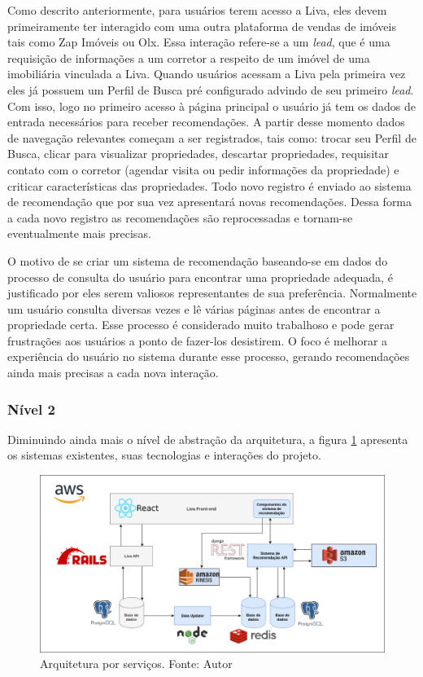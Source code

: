 Como descrito anteriormente, para usuários terem acesso a Liva, eles devem primeiramente ter interagido com uma outra plataforma de vendas de imóveis tais como Zap Imóveis ou Olx. Essa interação refere-se a um \textit{lead}, que é uma requisição de informações  a um corretor a respeito de um imóvel de uma imobiliária vinculada a Liva. Quando usuários acessam a Liva pela primeira vez eles já possuem um Perfil de Busca pré configurado advindo de seu primeiro \textit{lead}. Com isso, logo no primeiro acesso à página principal o usuário já tem os dados de entrada necessários para receber recomendações. A partir desse momento dados de navegação relevantes começam a ser registrados, tais como: trocar seu Perfil de Busca, clicar para visualizar propriedades, descartar propriedades, requisitar contato com o corretor (agendar visita ou pedir informações da propriedade) e criticar características das propriedades. Todo novo registro é enviado ao sistema de recomendação que por sua vez apresentará novas recomendações. Dessa forma a cada novo registro as recomendações são reprocessadas e tornam-se eventualmente mais precisas.

O motivo de se criar um sistema de recomendação baseando-se em dados do processo de consulta do usuário para encontrar uma propriedade adequada, é justificado por eles serem valiosos representantes de sua preferência. Normalmente um usuário consulta diversas vezes e lê várias páginas antes de encontrar a propriedade certa. Esse processo é considerado muito trabalhoso e pode gerar frustrações aos usuários a ponto de fazer-los desistirem. O foco é melhorar a experiência do usuário no sistema durante esse processo, gerando recomendações ainda mais precisas a cada nova interação.

\subsubsection{Nível 2}

Diminuindo ainda mais o nível de abstração da arquitetura, a figura \ref{fig:sr_nivel2} apresenta os sistemas existentes, suas tecnologias e interações do projeto.

\begin{figure}[H]
    \centering
    \includegraphics[scale=0.4]{figuras/proposta/sr_nivel2.png}
    \caption[Arquitetura por serviços]{Arquitetura por serviços. Fonte: Autor}
    \label{fig:sr_nivel2}
\end{figure}

